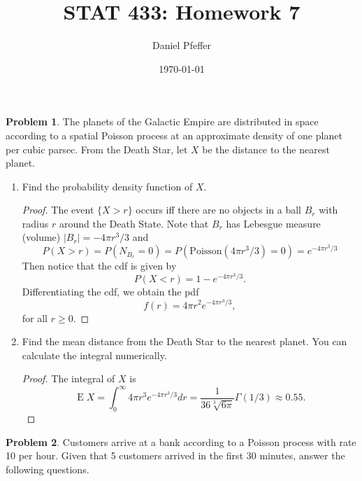\documentclass[oneside]{amsart}
\title{STAT 433: Homework 7}
\author{Daniel Pfeffer}
\date{\today}
\DeclareMathOperator{\E}{\mathrm{E}}
\newcommand{\Pois}{\mathrm{Poisson}}
\theoremstyle{definition}
\newtheorem{prob}{Problem}
\begin{document}
\maketitle

\begin{prob}
The planets of the Galactic Empire are distributed in space according to a spatial Poisson process at an approximate density of one planet per cubic parsec. From the Death Star, let $X$ be the distance to the nearest planet.
\end{prob}

\begin{enumerate}[label=(\alph*)]
\item
Find the probability density function of $X$.
\begin{proof}
The event $\{X > r\}$ occurs iff there are no objects in a ball $B_r$ with radius $r$ around the Death State. Note that $B_r$ has Lebesgue measure (volume) $|B_r| = -4 \pi r^3/3$ and 
\[
	P(X > r) = P(N_{B_r} = 0) = P(\Pois(4 \pi r^3/3) = 0) = e^{-4 \pi r^3/3}
\]
Then notice that the cdf is given by
\[
	P(X < r) = 1- e^{-4 \pi r^3/3}.
\]
Differentiating the cdf, we obtain the pdf 
\[
	f(r) = 4 \pi r^2 e^{-4 \pi r^3/3},
\]	
for all $r \geq 0$.
\end{proof}
\item
Find the mean distance from the Death Star to the nearest planet. You can calculate the integral numerically. 
\begin{proof}
The integral of $X$ is
\[
	\E X=\int_0^\infty 4 \pi r^3 e^{-4 \pi r^3/3} dr = \frac{1}{36 \sqrt[3]{6 \pi}}\Gamma(1/3) \approx 0.55.
\]
\end{proof}
\end{enumerate}


\begin{prob}
Customers arrive at a bank according to a Poisson process with rate 10 per hour. Given that 5 customers arrived in the first 30 minutes, answer the following questions.
\end{prob}
\end{document}
